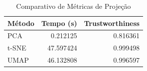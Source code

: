 \begin{table}
\caption{Comparativo de Métricas de Projeção}
\label{tab:metricas_projecao}
\begin{tabular}{lrr}
\toprule
Método & Tempo (s) & Trustworthiness \\
\midrule
PCA & 0.212125 & 0.816361 \\
t-SNE & 47.597424 & 0.999498 \\
UMAP & 46.132808 & 0.996597 \\
\bottomrule
\end{tabular}
\end{table}
